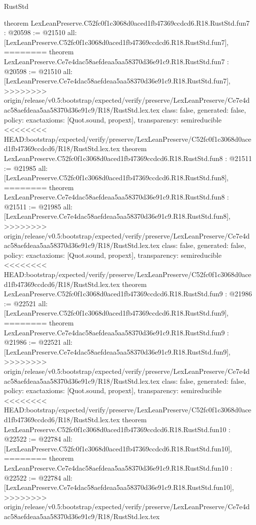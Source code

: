 \begin{lexlean}{RustStd}
\begin{coremodule}
{\begin{coremodule}
{{{{{{{{{theorem LexLeanPreserve.C52fc0f1c3068d0aced1fb47369ccdcd6.R18.RustStd.fun7 : @20598 := @21510 {
  all: [LexLeanPreserve.C52fc0f1c3068d0aced1fb47369ccdcd6.R18.RustStd.fun7],
========
theorem LexLeanPreserve.Ce7e4dac58aefdeaa5aa58370d36e91c9.R18.RustStd.fun7 : @20598 := @21510 {
  all: [LexLeanPreserve.Ce7e4dac58aefdeaa5aa58370d36e91c9.R18.RustStd.fun7],
>>>>>>>> origin/release/v0.5:bootstrap/expected/verify/preserve/LexLeanPreserve/Ce7e4dac58aefdeaa5aa58370d36e91c9/R18/RustStd.lex.tex
  class: false,
  generated: false,
  policy: exact{axioms: [Quot.sound, propext]},
  transparency: semireducible
}
<<<<<<<< HEAD:bootstrap/expected/verify/preserve/LexLeanPreserve/C52fc0f1c3068d0aced1fb47369ccdcd6/R18/RustStd.lex.tex
theorem LexLeanPreserve.C52fc0f1c3068d0aced1fb47369ccdcd6.R18.RustStd.fun8 : @21511 := @21985 {
  all: [LexLeanPreserve.C52fc0f1c3068d0aced1fb47369ccdcd6.R18.RustStd.fun8],
========
theorem LexLeanPreserve.Ce7e4dac58aefdeaa5aa58370d36e91c9.R18.RustStd.fun8 : @21511 := @21985 {
  all: [LexLeanPreserve.Ce7e4dac58aefdeaa5aa58370d36e91c9.R18.RustStd.fun8],
>>>>>>>> origin/release/v0.5:bootstrap/expected/verify/preserve/LexLeanPreserve/Ce7e4dac58aefdeaa5aa58370d36e91c9/R18/RustStd.lex.tex
  class: false,
  generated: false,
  policy: exact{axioms: [Quot.sound, propext]},
  transparency: semireducible
}
<<<<<<<< HEAD:bootstrap/expected/verify/preserve/LexLeanPreserve/C52fc0f1c3068d0aced1fb47369ccdcd6/R18/RustStd.lex.tex
theorem LexLeanPreserve.C52fc0f1c3068d0aced1fb47369ccdcd6.R18.RustStd.fun9 : @21986 := @22521 {
  all: [LexLeanPreserve.C52fc0f1c3068d0aced1fb47369ccdcd6.R18.RustStd.fun9],
========
theorem LexLeanPreserve.Ce7e4dac58aefdeaa5aa58370d36e91c9.R18.RustStd.fun9 : @21986 := @22521 {
  all: [LexLeanPreserve.Ce7e4dac58aefdeaa5aa58370d36e91c9.R18.RustStd.fun9],
>>>>>>>> origin/release/v0.5:bootstrap/expected/verify/preserve/LexLeanPreserve/Ce7e4dac58aefdeaa5aa58370d36e91c9/R18/RustStd.lex.tex
  class: false,
  generated: false,
  policy: exact{axioms: [Quot.sound, propext]},
  transparency: semireducible
}
<<<<<<<< HEAD:bootstrap/expected/verify/preserve/LexLeanPreserve/C52fc0f1c3068d0aced1fb47369ccdcd6/R18/RustStd.lex.tex
theorem LexLeanPreserve.C52fc0f1c3068d0aced1fb47369ccdcd6.R18.RustStd.fun10 : @22522 := @22784 {
  all: [LexLeanPreserve.C52fc0f1c3068d0aced1fb47369ccdcd6.R18.RustStd.fun10],
========
theorem LexLeanPreserve.Ce7e4dac58aefdeaa5aa58370d36e91c9.R18.RustStd.fun10 : @22522 := @22784 {
  all: [LexLeanPreserve.Ce7e4dac58aefdeaa5aa58370d36e91c9.R18.RustStd.fun10],
>>>>>>>> origin/release/v0.5:bootstrap/expected/verify/preserve/LexLeanPreserve/Ce7e4dac58aefdeaa5aa58370d36e91c9/R18/RustStd.lex.tex
}}}}}}}}}}}}}}
\end{coremodule}}
\end{coremodule}
\end{lexlean}
